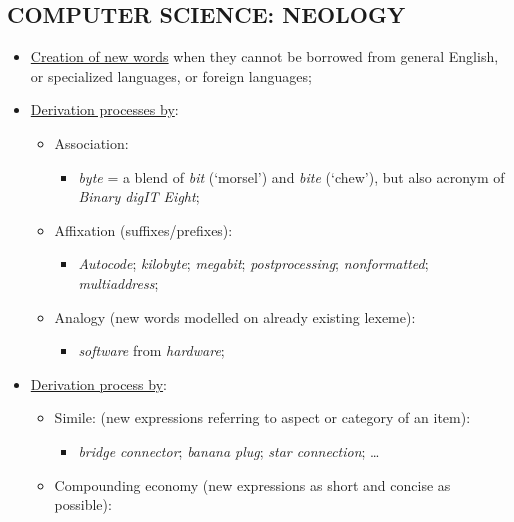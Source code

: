 \subsection{COMPUTER SCIENCE: NEOLOGY}

\begin{itemize}

\item \underline{Creation of new words} when they cannot be borrowed from general English, or specialized languages, or foreign languages;
\item \underline{Derivation processes by}:

\begin{itemize}
\item Association:
\begin{itemize}
\item \textit{byte} = a blend of \textit{bit} (‘morsel’) and \textit{bite} (‘chew’), but also acronym of \textit{Binary digIT Eight};
\end{itemize}
\item Affixation (suffixes/prefixes):
\begin{itemize}
\item \textit{Autocode}; \textit{kilobyte}; \textit{megabit}; \textit{postprocessing}; \textit{nonformatted}; \textit{multiaddress};
\end{itemize}
\item Analogy (new words modelled on already existing lexeme):
\begin{itemize}
\item \textit{software} from \textit{hardware};
\end{itemize}
\end{itemize}

\item\underline{Derivation process by}:

\begin{itemize}

\item Simile: (new expressions referring to aspect or category of an item):

\begin{itemize}
\item \textit{bridge connector}; \textit{banana plug}; \textit{star connection}; …
\end{itemize}

\item Compounding economy (new expressions as short and concise as possible):


\end{itemize}
\end{itemize}
